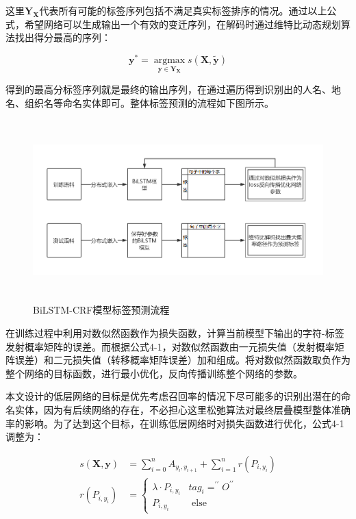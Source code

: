 \documentclass[winfonts,master,oneside,nobackinfo]{njuthesis}
\begin{document}
这里$\bm{Y}_{\bm{X}}$代表所有可能的标签序列包括不满足真实标签排序的情况。通过以上公式，希望网络可以生成输出一个有效的变迁序列，在解码时通过维特比动态规划算法找出得分最高的序列：

\begin{equation} 
\bm{y}^{*}=\underset{\bm{y} \in \bm{Y}_{\bm{X}}}{\operatorname{argmax}} s(\bm{X}, \widetilde{\bm{y}})
\end{equation}

得到的最高分标签序列就是最终的输出序列，在通过遍历得到识别出的人名、地名、组织名等命名实体即可。整体标签预测的流程如下图所示。

\begin{figure}[H]
\centering
\begin{minipage}[t]{\textwidth}
\includegraphics[width=1\textwidth,height=7cm]{./figure/标签预测流程.jpg}
\caption{BiLSTM-CRF模型标签预测流程}
\label{lab:1}
\end{minipage}
\end{figure}

在训练过程中利用对数似然函数作为损失函数，计算当前模型下输出的字符-标签发射概率矩阵的误差。而根据公式4-1，对数似然函数由一元损失值（发射概率矩阵误差）和二元损失值（转移概率矩阵误差）加和组成。将对数似然函数取负作为整个网络的目标函数，进行最小优化，反向传播训练整个网络的参数。

本文设计的低层网络的目标是优先考虑召回率的情况下尽可能多的识别出潜在的命名实体，因为有后续网络的存在，不必担心这里松弛算法对最终层叠模型整体准确率的影响。为了达到这个目标，在训练低层网络时对损失函数进行优化，公式4-1调整为：

\begin{equation} 
\begin{split}
s(\bm{X}, \bm{y})&=\sum_{i=0}^{n} A_{y_{i}, y_{i+1}}+\sum_{i=1}^{n} r(P_{i, y_{i}}) \\ 
r\left(P_{i, y_{i}}\right)&=\left\{\begin{array}{ll}{\lambda \cdot P_{i, y_{i}}} & {t a g_{i}=^{\prime \prime} O^{\prime \prime}} \\ {P_{i, y_{i}}} & {\text { else }}\end{array}\right.
\end{split}
\end{equation}
\end{document}
